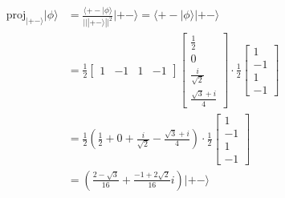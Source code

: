\begin{align*}
    \mathrm{proj}_{|+-\rangle}|\phi\rangle & = \frac{\langle+-|\phi\rangle}{|||+-\rangle||^2} |+-\rangle = \langle+-|\phi\rangle |+-\rangle                        \\
                                           & = \frac{1}{2}\begin{bmatrix}
                                                              1 & -1 & 1 & -1
                                                          \end{bmatrix}
    \begin{bmatrix}
        \frac{1}{2}        \\
        0                  \\
        \frac{i}{\sqrt{2}} \\
        \frac{\sqrt{3}+i}{4}
    \end{bmatrix}
    \cdot \frac{1}{2}\begin{bmatrix}
                         1  \\
                         -1 \\
                         1  \\
                         -1
                     \end{bmatrix}                                                                                                                                \\
                                           & = \frac{1}{2}\left(\frac{1}{2} + 0 + \frac{i}{\sqrt{2}} - \frac{\sqrt{3}+i}{4}\right) \cdot \frac{1}{2}\begin{bmatrix}
                                                                                                                                                        1  \\
                                                                                                                                                        -1 \\
                                                                                                                                                        1  \\
                                                                                                                                                        -1
                                                                                                                                                    \end{bmatrix} \\
                                           & =  \left(\frac{2 - \sqrt{3}}{16} + \frac{-1 + 2\sqrt{2}}{16}i\right)|+-\rangle
\end{align*}
